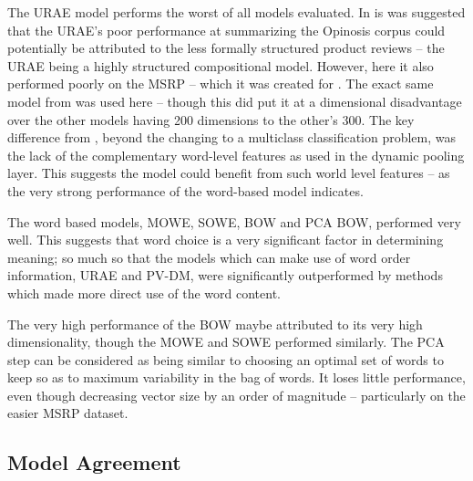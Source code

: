 \documentclass[]{book}
\begin{document}
The URAE model performs the worst of all models evaluated. In \cite{KaagebExtractiveSummaristation}
is was suggested that the URAE's poor performance at summarizing the
Opinosis corpus could potentially be attributed to the less formally
structured product reviews -- the URAE being a highly structured compositional
model. However, here it also performed poorly on the MSRP -- which
it was created for \cite{SocherEtAl2011:PoolRAE}. The exact same
model from \cite{SocherEtAl2011:PoolRAE} was used here -- though
this did put it at a dimensional disadvantage over the other models
having 200 dimensions to the other's 300. The key difference from
\cite{SocherEtAl2011:PoolRAE}, beyond the changing to a multiclass
classification problem, was the lack of the complementary word-level
features as used in the dynamic pooling layer. This suggests the model
could benefit from such world level features -- as the very strong
performance of the word-based model indicates.

The word based models, MOWE, SOWE, BOW and PCA BOW, performed very
well. This suggests that word choice is a very significant factor
in determining meaning; so much so that the models which can make
use of word order information, URAE and PV-DM, were significantly
outperformed by methods which made more direct use of the word content. 

The very high performance of the BOW maybe attributed to its very
high dimensionality, though the MOWE and SOWE performed similarly.
The PCA step can be considered as being similar to choosing an optimal
set of words to keep so as to maximum variability in the bag of words.
It loses little performance, even though decreasing vector size by
an order of magnitude -- particularly on the easier MSRP dataset.


\subsection{Model Agreement}
\end{document}
